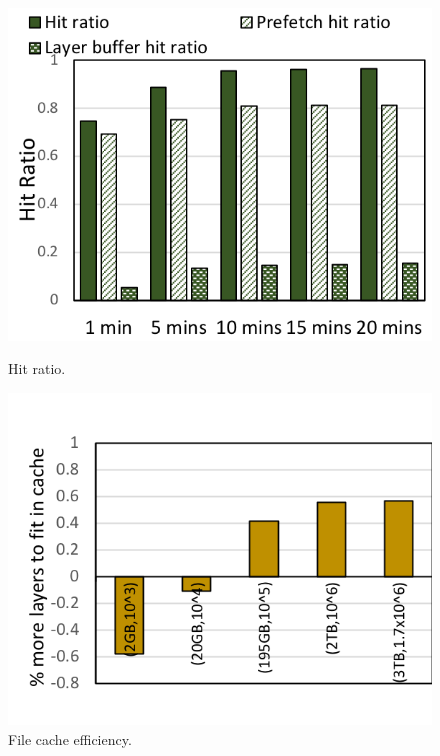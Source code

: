 \begin{figure}[t]
	\centering
		\begin{minipage}{0.23\textwidth}
			\centering
			\includegraphics[width=1\textwidth]{graphs/evaluation_hitratios.png}
			\caption{Hit ratio.}
			\label{fig:hitratio}
		\end{minipage}
		\begin{minipage}{0.24\textwidth}
			\centering
			\includegraphics[width=1\textwidth]{graphs/percentage_morelayers_afterdedup.png}
			\caption{File cache efficiency.}
			\label{fig:cacheefficiency}
		\end{minipage}
\end{figure}